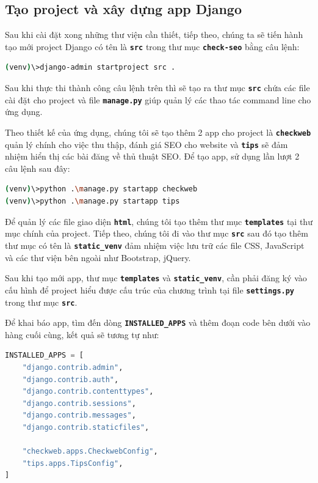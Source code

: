 \subsection{Tạo project và xây dựng app Django}
Sau khi cài đặt xong những thư viện cần thiết, tiếp theo, chúng ta sẽ tiến hành tạo mới project Django có tên là \textbf{\texttt{src}} trong thư mục \textbf{\texttt{check-seo}} bằng câu lệnh:
\begin{lstlisting}[language=bash]
(venv)\>django-admin startproject src .
\end{lstlisting}
\par
Sau khi thực thi thành công câu lệnh trên thì sẽ tạo ra thư mục \textbf{\texttt{src}} chứa các file cài đặt cho project và file \textbf{\texttt{manage.py}} giúp quản lý các thao tác command line cho ứng dụng.
\par
Theo thiết kế của ứng dụng, chúng tôi sẽ tạo thêm 2 app cho project là \textbf{\texttt{checkweb}} quản lý chính cho việc thu thập, đánh giá SEO cho website và \textbf{\texttt{tips}} sẽ đảm nhiệm hiển thị các bài đăng về thủ thuật SEO. Để tạo app, sử dụng lần lượt 2 câu lệnh sau đây:
\begin{lstlisting}[language=bash]
(venv)\>python .\manage.py startapp checkweb
(venv)\>python .\manage.py startapp tips
\end{lstlisting}
\par
Để quản lý các file giao diện \textbf{\texttt{html}}, chúng tôi tạo thêm thư mục \textbf{\texttt{templates}} tại thư mục chính của project. Tiếp theo, chúng tôi đi vào thư mục \textbf{\texttt{src}} sau đó tạo thêm thư mục có tên là \textbf{\texttt{static\_venv}} đảm nhiệm việc lưu trữ các file CSS, JavaScript và các thư viện bên ngoài như Bootstrap, jQuery.
\par
Sau khi tạo mới app, thư mục \textbf{\texttt{templates}} và \textbf{\texttt{static\_venv}}, cần phải đăng ký vào cấu hình để project hiểu được cấu trúc của chương trình tại file \textbf{\texttt{settings.py}} trong thư mục \textbf{\texttt{src}}.
\par
Để khai báo app, tìm đến dòng \textbf{\texttt{INSTALLED\_APPS}} và thêm đoạn code bên dưới vào hàng cuối cùng, kết quả sẽ tương tự như:
\begin{lstlisting}[language=Python]
INSTALLED_APPS = [
    "django.contrib.admin",
    "django.contrib.auth",
    "django.contrib.contenttypes",
    "django.contrib.sessions",
    "django.contrib.messages",
    "django.contrib.staticfiles",

    "checkweb.apps.CheckwebConfig",
    "tips.apps.TipsConfig",
]
\end{lstlisting}
